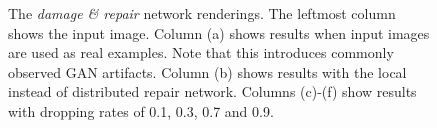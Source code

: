 \documentclass[10pt,twocolumn,letterpaper]{article}
\begin{document}
\begin{figure}[t]

\begin{center}\hspace{-3mm}
\end{center}
   \caption{The \emph{damage \& repair} network renderings. The leftmost column shows the input image. Column (a) shows results when input images are used as real examples. Note that this introduces commonly observed GAN artifacts. Column (b) shows results with the local instead of distributed repair network. Columns (c)-(f) show results with dropping rates of 0.1, 0.3, 0.7 and 0.9.}
\label{fig:analysis}
\end{figure}
\end{document}
